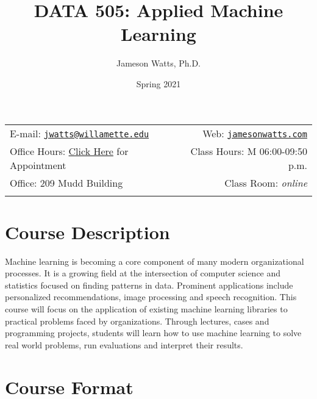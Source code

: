 \documentclass[11pt,]{article}
\title{DATA 505: Applied Machine Learning}
\author{Jameson Watts, Ph.D.}
\date{Spring 2021}
\begin{document}
  

		\maketitle
		
	
		\thispagestyle{firststyle}



	\noindent \begin{tabular*}{\textwidth}{ @{\extracolsep{\fill}} lr @{\extracolsep{\fill}}}


E-mail: \texttt{\href{mailto:jwatts@willamette.edu}{\nolinkurl{jwatts@willamette.edu}}} & Web: \href{http://jamesonwatts.com}{\tt jamesonwatts.com}\\
Office Hours: \href{https://calendar.google.com/calendar/u/0/selfsched?sstoken=UUltRXJtZHQwTXlHfGRlZmF1bHR8YzBkZmIzM2IwZDg4ODhiNDc0NTgzZTAwOGU2YTI3ZDk}{Click
Here} for Appointment  &  Class Hours: M 06:00-09:50 p.m.\\
Office: 209 Mudd Building  & Class Room: \emph{online}\\
	&  \\
	\hline
	\end{tabular*}
	
\vspace{2mm}
	


\hypertarget{course-description}{%
\section{Course Description}\label{course-description}}

Machine learning is becoming a core component of many modern
organizational processes. It is a growing field at the intersection of
computer science and statistics focused on finding patterns in data.
Prominent applications include personalized recommendations, image
processing and speech recognition. This course will focus on the
application of existing machine learning libraries to practical problems
faced by organizations. Through lectures, cases and programming
projects, students will learn how to use machine learning to solve real
world problems, run evaluations and interpret their results.

\hypertarget{course-format}{%
\section{Course Format}\label{course-format}}
\end{document}
